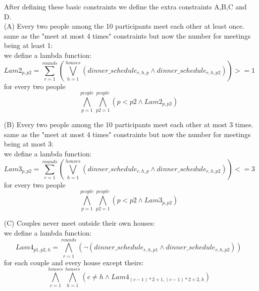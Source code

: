 \documentclass[12pt]{article}
\begin{document}
After defining these basic constraints we define the extra constraints A,B,C and D. \\

(A) Every two people among the 10 participants meet each other at least once. same as the "meet at most 4 times" constraints but now the number for meetings being at least 1:\\
we define a lambda function:
\[ Lam2_{p,p2} = \sum_{r=1}^{rounds} \left( \bigvee_{h = 1}^{houses} \left( dinner\_schedule_{r,h,p} \land dinner\_schedule_{r,h,p2} \right)  \right) >= 1 \]
for every two people
\[ \bigwedge_{p=1}^{people} \bigwedge_{p2=1}^{people} \left( p <p2 \land Lam2_{p,p2}\right)  \]

(B) Every two people among the 10 participants meet each other at most 3 times. same as the "meet at most 4 times" constraints but now the number for meetings being at most 3:\\

we define a lambda function:
\[ Lam3_{p,p2} = \sum_{r=1}^{rounds} \left( \bigvee_{h = 1}^{houses} \left( dinner\_schedule_{r,h,p} \land dinner\_schedule_{r,h,p2} \right)  \right) <= 3 \]
for every two people
\[ \bigwedge_{p=1}^{people} \bigwedge_{p2=1}^{people} \left( p <p2 \land Lam3_{p,p2}\right)  \]


(C) Couples never meet outside their own houses:\\
we define a lambda function:
\[ Lam4_{p1,p2,h} =\bigwedge_{r=1}^{rounds} \left( \neg \left( dinner\_schedule_{r,h,p1} \land dinner\_schedule_{r,h,p2} \right) \right)\]
for each couple and every house except theirs:
\[ \bigwedge_{c=1}^{houses} \bigwedge_{h=1}^{houses} \left( c \neq h \land Lam4_{(c-1)*2+1,(c-1)*2+2,h}\right) \]
\end{document}
